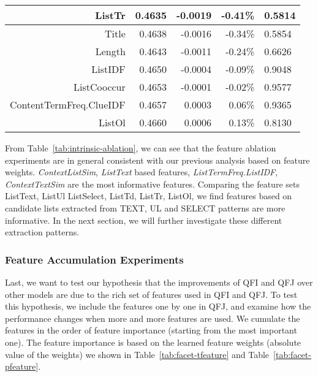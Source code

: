 \begin{table}[!ht]
\begin{tabular}{|r|r|r|r|l|}
ListTr & 0.4635 & -0.0019 & -0.41\% & 0.5814 \\ \hline
Title & 0.4638 & -0.0016 & -0.34\% & 0.5854 \\ \hline
Length & 0.4643 & -0.0011 & -0.24\% & 0.6626 \\ \hline
ListIDF & 0.4650 & -0.0004 & -0.09\% & 0.9048 \\ \hline
ListCooccur & 0.4653 & -0.0001 & -0.02\% & 0.9577 \\ \hline
ContentTermFreq.ClueIDF & 0.4657 & 0.0003 & 0.06\% & 0.9365 \\ \hline
ListOl & 0.4660 & 0.0006 & 0.13\% & 0.8130 \\ \hline
\end{tabular}
\end{table}

From Table~\ref{tab:intrinsic-ablation}, we can see that the feature ablation experiments are in general consistent with our previous analysis based on feature weights. \textit{ContextListSim}, \textit{ListText} based features, \textit{ListTermFreq.ListIDF}, \textit{ContextTextSim} are the most informative features. Comparing the feature sets ListText, ListUl ListSelect, ListTd, ListTr, ListOl, we find features based on candidate lists extracted from TEXT, UL and SELECT patterns are more informative. In the next section, we will further investigate these different extraction patterns.


\subsubsection{Feature Accumulation Experiments}
Last, we want to test our hypothesis that the improvements of QFI and QFJ over other models are due to the rich set of features used in QFI and QFJ. To test this hypothesis, we include the features one by one in QFJ, and examine how the performance changes when more and more features are used. We cumulate the features in the order of feature importance (starting from the most important one). The feature importance is based on the learned feature weights (absolute value of the weights) we shown in Table~\ref{tab:facet-tfeature} and Table~\ref{tab:facet-pfeature}. 

